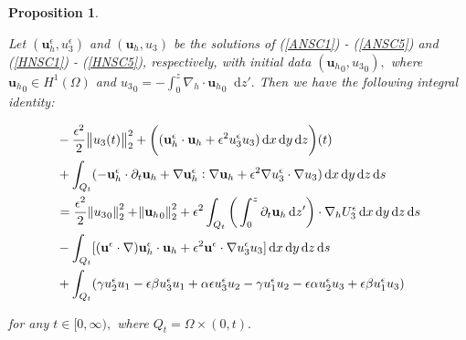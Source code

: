\documentclass[11pt]{article}
\newtheorem{prop}{Proposition}
\newcommand*\diff{\mathop{}\!\mathrm{d}}
\begin{document}
\begin{prop} \label{propIdentity}

Let $(\mathbf{u}_h^\epsilon, u_3^\epsilon)$ and $(\mathbf{u}_h,u_3)$ be the solutions of (\ref{ANSC1}) - (\ref{ANSC5}) and (\ref{HNSC1}) - (\ref{HNSC5}), respectively, with initial data $({\mathbf{u}_h}_0, {u_3}_0),$ where ${\mathbf{u}_h}_0 \in H^1(\Omega)$ and ${u_3}_0 = - \int_0^z \nabla_h \cdot {\mathbf{u}_h}_0 \diff z'.$ Then we have the following integral identity:

\begin{equation} \label{integralIdentity_prop}
  \begin{split}
    & - \frac{\epsilon^2}{2} \norm{u_3(t)}_2^2 + \bigg ( (\mathbf{u}_h^\epsilon \cdot \mathbf{u}_h + \epsilon^2 u_3^\epsilon u_3) \diff x \diff y \diff z  \bigg ) (t) \\
    & + \int_{Q_t} (-\mathbf{u}_h^\epsilon \cdot \partial_t \mathbf{u}_h + \nabla \mathbf{u}_h^\epsilon : \nabla \mathbf{u}_h + \epsilon^2 \nabla u_3^\epsilon \cdot \nabla u_3) \diff x \diff y \diff z \diff s \\
    & = \frac{\epsilon^2}{2} \norm{{u_3}_0}_2^2 + \norm{{\mathbf{u}_h}_0}_2^2 + \epsilon^2 \int_{Q_t} \bigg ( \int_0^z \partial_t \mathbf{u}_h \diff z' \bigg ) \cdot \nabla_h U_3^\epsilon \diff x \diff y \diff z \diff s \\
    & - \int_{Q_t} [(\mathbf{u}^\epsilon \cdot \nabla) \mathbf{u}_h^\epsilon \cdot \mathbf{u}_h + \epsilon^2 \mathbf{u}^\epsilon \cdot \nabla u_3^\epsilon u_3] \diff x \diff y \diff z \diff s \\
    & + \int_{Q_t}  ( \gamma u_2^\epsilon u_1 - \epsilon \beta u_3^\epsilon u_1 + \alpha \epsilon u_3^\epsilon u_2 - \gamma u_1^\epsilon u_2 - \epsilon \alpha u^\epsilon_2 u_3 + \epsilon \beta u_1^\epsilon u_3)
  \end{split}
\end{equation}

for any $t \in [0, \infty),$ where $Q_t = \Omega \times (0,t).$

\end{prop}
\end{document}
